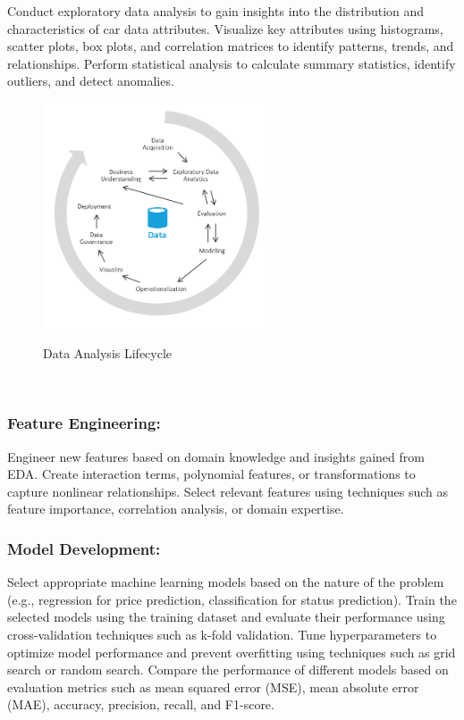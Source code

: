 \documentclass{article}
\begin{document}
{Conduct exploratory data analysis to gain insights into the distribution and characteristics of car data attributes.
Visualize key attributes using histograms, scatter plots, box plots, and correlation matrices to identify patterns, trends, and relationships.
Perform statistical analysis to calculate summary statistics, identify outliers, and detect anomalies.
\begin{figure}[htbp]
  \centering
  \vspace{0.3cm}
  \includegraphics[width=0.6\textwidth]{Figures/Python/EDA.png}\\
  \caption{Data Analysis Lifecycle}
  \vspace{0.3cm}
\end{figure}
\\
\subsubsection{Feature Engineering:}

Engineer new features based on domain knowledge and insights gained from EDA.
Create interaction terms, polynomial features, or transformations to capture nonlinear relationships.
Select relevant features using techniques such as feature importance, correlation analysis, or domain expertise.
\subsubsection{Model Development:}

Select appropriate machine learning models based on the nature of the problem (e.g., regression for price prediction, classification for status prediction).
Train the selected models using the training dataset and evaluate their performance using cross-validation techniques such as k-fold validation.
Tune hyperparameters to optimize model performance and prevent overfitting using techniques such as grid search or random search.
Compare the performance of different models based on evaluation metrics such as mean squared error (MSE), mean absolute error (MAE), accuracy, precision, recall, and F1-score.
}
\end{document}

